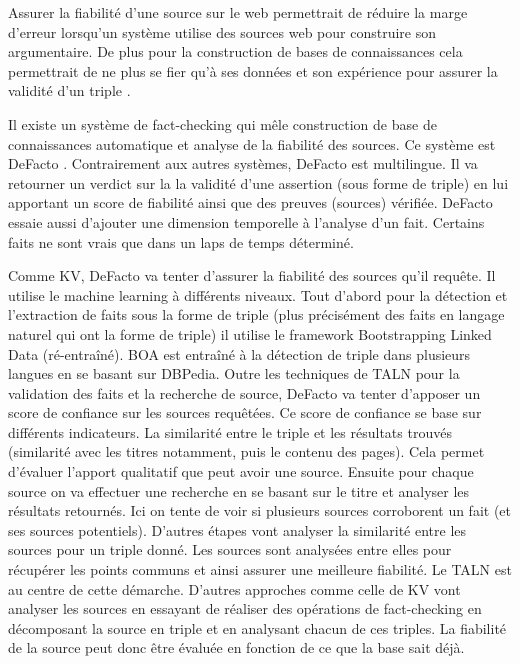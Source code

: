 Assurer la fiabilité d'une source sur le web permettrait de réduire la marge d'erreur lorsqu'un système utilise des sources web pour construire son argumentaire. De plus pour la construction de bases de connaissances cela permettrait de ne plus se fier qu'à ses données et son expérience pour assurer la validité d'un triple \cite{dong2015knowledge}.

Il existe un système de fact-checking qui mêle construction de base de connaissances automatique et analyse de la fiabilité des sources. Ce système est DeFacto \cite{gerber2015}. Contrairement aux autres systèmes, DeFacto est multilingue. Il va retourner un verdict sur la la validité d'une assertion (sous forme de triple) en lui apportant un score de fiabilité ainsi que des preuves (sources) vérifiée. DeFacto essaie aussi d'ajouter une dimension temporelle à l'analyse d'un fait. Certains faits ne sont vrais que dans un laps de temps déterminé.

Comme KV, DeFacto va tenter d'assurer la fiabilité des sources qu'il requête. Il utilise le machine learning à différents niveaux. Tout d'abord pour la détection et l'extraction de faits sous la forme de triple (plus précisément des faits en langage naturel qui ont la forme de triple) il utilise le framework Bootstrapping Linked Data (ré-entraîné). BOA est entraîné à la détection de triple dans plusieurs langues en se basant sur DBPedia. Outre les techniques de TALN pour la validation des faits et la recherche de source, DeFacto va tenter d'apposer un score de confiance sur les sources requêtées. Ce score de confiance se base sur différents indicateurs. La similarité entre le triple et les résultats trouvés (similarité avec les titres notamment, puis le contenu des pages). Cela permet d'évaluer l'apport qualitatif que peut avoir une source. Ensuite pour chaque source on va effectuer une recherche en se basant sur le titre et analyser les résultats retournés. Ici on tente de voir si plusieurs sources corroborent un fait (et ses sources potentiels). D'autres étapes vont analyser la similarité entre les sources pour un triple donné. Les sources sont analysées entre elles pour récupérer les points communs et ainsi assurer une meilleure fiabilité. Le TALN est au centre de cette démarche. D'autres approches comme celle de KV vont analyser les sources en essayant de réaliser des opérations de fact-checking en décomposant la source en triple et en analysant chacun de ces triples. La fiabilité de la source peut donc être évaluée en fonction de ce que la base sait déjà.

